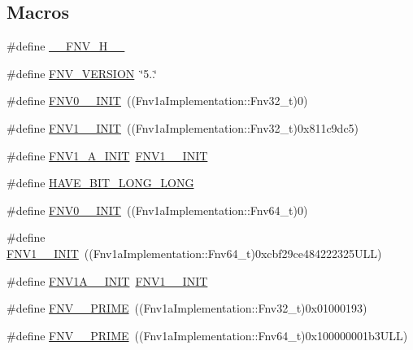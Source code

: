 \subsection*{Macros}
\begin{DoxyCompactItemize}
\item 
\#define \hyperlink{group__hash__fnv_gac8e163567fdac1fd24f2871819172457}{\+\_\+\+\_\+\+F\+N\+V\+\_\+\+H\+\_\+\+\_\+}
\item 
\#define \hyperlink{group__hash__fnv_gafc332c72d6d3d69585287caedad7c292}{F\+N\+V\+\_\+\+V\+E\+R\+S\+I\+ON}~\char`\"{}5..\char`\"{}
\item 
\#define \hyperlink{group__hash__fnv_ga059b80066b559fcc2869a8679f2abd3a}{F\+N\+V0\+\_\+\_\+\+I\+N\+IT}~((Fnv1a\+Implementation\+::\+Fnv32\+\_\+t)0)
\item 
\#define \hyperlink{group__hash__fnv_ga47ad2404853d345b29ec28838f6414f7}{F\+N\+V1\+\_\+\_\+\+I\+N\+IT}~((Fnv1a\+Implementation\+::\+Fnv32\+\_\+t)0x811c9dc5)
\item 
\#define \hyperlink{group__hash__fnv_ga40a142ccb9ca21d50ea9f6ed8589cc96}{F\+N\+V1\+\_\+A\+\_\+\+I\+N\+IT}~\hyperlink{group__hash__fnv_ga47ad2404853d345b29ec28838f6414f7}{F\+N\+V1\+\_\+\_\+\+I\+N\+IT}
\item 
\#define \hyperlink{group__hash__fnv_gae08b3a786e98cbb5778e6fb75beaa485}{H\+A\+V\+E\+\_\+B\+I\+T\+\_\+\+L\+O\+N\+G\+\_\+\+L\+O\+NG}
\item 
\#define \hyperlink{group__hash__fnv_gacb9cb4b59bd9db3a5d335369fa58032a}{F\+N\+V0\+\_\+\_\+\+I\+N\+IT}~((Fnv1a\+Implementation\+::\+Fnv64\+\_\+t)0)
\item 
\#define \hyperlink{group__hash__fnv_ga97c6e8016ffe540a627163d406059552}{F\+N\+V1\+\_\+\_\+\+I\+N\+IT}~((Fnv1a\+Implementation\+::\+Fnv64\+\_\+t)0xcbf29ce484222325\+U\+L\+L)
\item 
\#define \hyperlink{group__hash__fnv_ga1eb99785c4898f16341824639f52d50f}{F\+N\+V1\+A\+\_\+\_\+\+I\+N\+IT}~\hyperlink{group__hash__fnv_ga97c6e8016ffe540a627163d406059552}{F\+N\+V1\+\_\+\_\+\+I\+N\+IT}
\item 
\#define \hyperlink{group__hash__fnv_gae13a6565bea334e9b6fb19033a392857}{F\+N\+V\+\_\+\_\+\+P\+R\+I\+ME}~((Fnv1a\+Implementation\+::\+Fnv32\+\_\+t)0x01000193)
\end{DoxyCompactItemize}
{\bf }\par
\begin{DoxyCompactItemize}
\item 
\#define \hyperlink{group__hash__fnv_ga843a032e93d6d54b28933d827eb4c966}{F\+N\+V\+\_\+\_\+\+P\+R\+I\+ME}~((Fnv1a\+Implementation\+::\+Fnv64\+\_\+t)0x100000001b3\+U\+L\+L)
\end{DoxyCompactItemize}

